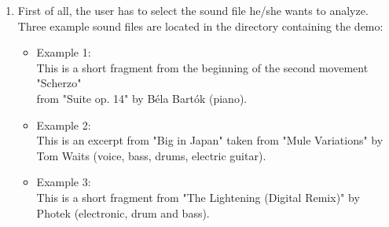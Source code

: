\begin{enumerate}
\item
    First of all, the user has to select the sound file he/she
    wants to analyze.\\
    Three example sound files are located in the directory containing
    the demo:
    \begin{itemize}
    \item Example 1: \\
        This is a short fragment from the beginning of the second movement "Scherzo"\\
        from "Suite op. 14" by B\'{e}la Bart\'{o}k (piano).
    \item Example 2: \\
        This is an excerpt from "Big in Japan" taken from "Mule Variations" by Tom Waits
        (voice, bass, drums, electric guitar).
    \item Example 3: \\
        This is a short fragment from "The Lightening (Digital Remix)" by Photek
        (electronic, drum and bass).
    \end{itemize}


\end{enumerate}
